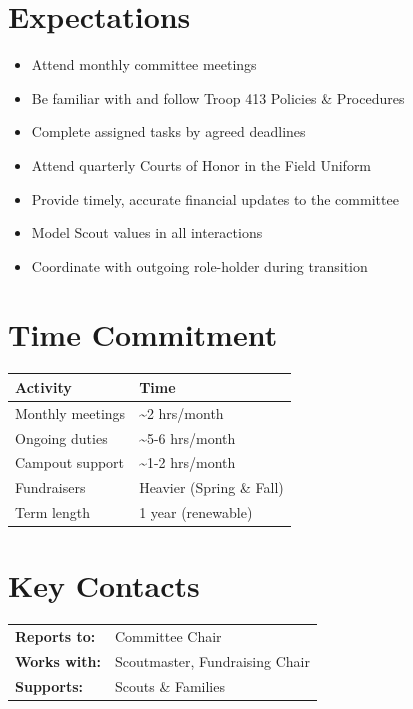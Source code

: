 \documentclass[11pt, letterpaper]{article}
\begin{document}
\hfill
\begin{minipage}[t]{0.48\linewidth}
\raggedright

\section{Expectations}
\begin{itemize}
  \item Attend monthly committee meetings
  \item Be familiar with and follow Troop 413 Policies \& Procedures
  \item Complete assigned tasks by agreed deadlines
  \item Attend quarterly Courts of Honor in the Field Uniform
  \item Provide timely, accurate financial updates to the committee
  \item Model Scout values in all interactions
  \item Coordinate with outgoing role-holder during transition
\end{itemize}

\section{Time Commitment}
\begin{tabular}{@{}p{3.0cm} p{3.8cm}@{}}
  \toprule
  \textbf{Activity} & \textbf{Time} \\
  \midrule
  Monthly meetings  & \textasciitilde{}2 hrs/month \\
  Ongoing duties    & \textasciitilde{}5-6 hrs/month \\
  Campout support   & \textasciitilde{}1-2 hrs/month \\
  Fundraisers       & Heavier (Spring \& Fall) \\
  Term length       & 1 year (renewable) \\
  \bottomrule
\end{tabular}

\vspace{1em}

\section{Key Contacts}
\begin{tabular}{@{}p{2.6cm} >{\raggedright\arraybackslash}p{4.2cm}@{}}
  \textbf{Reports to:}  & Committee Chair \\
  \textbf{Works with:}  & Scoutmaster, Fundraising Chair \\
  \textbf{Supports:}    & Scouts \& Families \\
\end{tabular}

\end{minipage}
\end{document}
